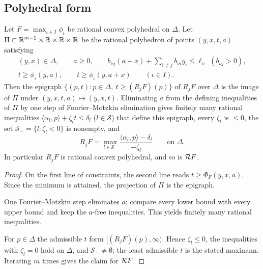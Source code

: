 \subsection{Polyhedral form}\label{sec:fcp-polyhedral}

\begin{lemma}\label{lem:fcp-polyhedral}
Let $F=\max_{\iota\in I}\phi_\iota$ be rational convex polyhedral on $\Delta$. Let
$\Pi\subset\mathbb{R}^{m-1}\times\mathbb{R}\times\mathbb{R}\times\mathbb{R}$ be the rational polyhedron of points $(y,x,t,a)$ satisfying
\begin{gather*}
 (y,x)\in\Delta,\qquad a\ge0,\qquad b_{\nu j}(a+x)+\textstyle\sum_{i\ne j}b_{\nu i}y_i\le\ell_\nu\ \ (b_{\nu j}>0),\\
 t\ge\phi_\iota(y,a),\qquad t\ge\phi_\iota(y,a+x)\qquad(\iota\in I).
\end{gather*}
Then the epigraph $\{(p,t):p\in\Delta,\ t\ge(R_jF)(p)\}$ of $R_jF$ over $\Delta$ is the image of $\Pi$ under
$(y,x,t,a)\mapsto(y,x,t)$. Eliminating $a$ from the defining inequalities of $\Pi$ by one step of Fourier--Motzkin
elimination gives finitely many rational inequalities $\langle\alpha_l,p\rangle+\zeta_lt\le\delta_l$
($l\in\mathcal S$) that define this epigraph, every $\zeta_l$ is $\le0$, the set $\mathcal S_-=\{l:\zeta_l<0\}$ is
nonempty, and
\[
 R_jF=\max_{l\in\mathcal S_-}\frac{\langle\alpha_l,p\rangle-\delta_l}{-\zeta_l}\qquad\text{on }\Delta .
\]
In particular $R_jF$ is rational convex polyhedral, and so is $\mathcal{R} F$.
\end{lemma}

\begin{proof}
On the first line of constraints, the second line reads $t\ge\Phi_F(y,x,a)$. Since the minimum is attained, the projection of $\Pi$ is the epigraph.

One Fourier--Motzkin step \cite[\S12.2]{Schrijver1986} eliminates $a$: compare every lower bound with every upper bound and keep the $a$-free inequalities. This yields finitely many rational inequalities.

For $p\in\Delta$ the admissible $t$ form $[(R_jF)(p),\infty)$. Hence $\zeta_l\le0$, the inequalities with $\zeta_l=0$ hold on $\Delta$, and $\mathcal S_-\ne\emptyset$; the least admissible $t$ is the stated maximum. Iterating $m$ times gives the claim for $\mathcal{R} F$.
\end{proof}

